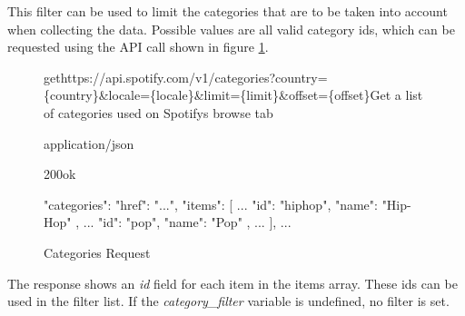This filter can be used to limit the categories that are to be taken into account when collecting the data.
Possible values are all valid category ids, which can be requested using the API call shown in figure \ref{fig:Categories Request}.

\begin{figure}[H]
    \caption{Categories Request}
	\label{fig:Categories Request}
\begin{apiRoute}{get}{https://api.spotify.com/v1/categories?country=\{country\}\&locale=\{locale\}\&limit=\{limit\}\&offset=\{offset\}}{Get a list of categories used on Spotifys browse tab}
    \begin{routeParameter}
    \end{routeParameter}
    \begin{routeResponse}{application/json}
        \begin{routeResponseItem}{200}{ok}
            \begin{routeResponseItemBody}
{
  "categories": {
    "href": "...",
    "items": [
      {
        ...
        "id": "hiphop",
        "name": "Hip-Hop"
        },
        {
          ...
          "id": "pop",
          "name": "Pop"
        },
        ...
    ],
    ...
  }
}
            \end{routeResponseItemBody}
        \end{routeResponseItem}
    \end{routeResponse}
\end{apiRoute}
\end{figure}

The response shows an \emph{id} field for each item in the items array.
These ids can be used in the filter list.
If the \emph{category\_filter} variable is undefined, no filter is set.

%
%
%

